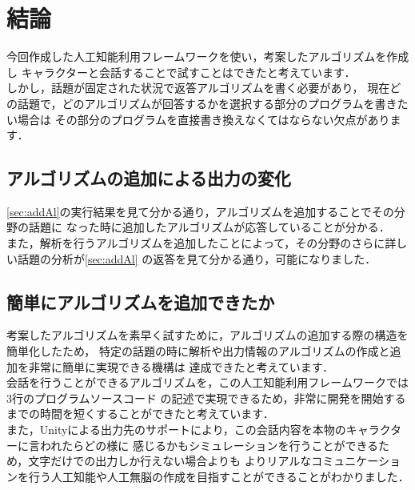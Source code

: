 
\section{結論}
今回作成した人工知能利用フレームワークを使い，考案したアルゴリズムを作成し
キャラクターと会話することで試すことはできたと考えています．
\\
しかし，話題が固定された状況で返答アルゴリズムを書く必要があり，
現在どの話題で，どのアルゴリズムが回答するかを選択する部分のプログラムを書きたい場合は
その部分のプログラムを直接書き換えなくてはならない欠点があります．

\subsection{アルゴリズムの追加による出力の変化}
\ref{sec:addAl}の実行結果を見て分かる通り，アルゴリズムを追加することでその分野の話題に
なった時に追加したアルゴリズムが応答していることが分かる．\\
また，解析を行うアルゴリズムを追加したことによって，その分野のさらに詳しい話題の分析が\ref{sec:addAl}
の返答を見て分かる通り，可能になりました．\\

\subsection{簡単にアルゴリズムを追加できたか}
考案したアルゴリズムを素早く試すために，アルゴリズムの追加する際の構造を簡単化したため，
特定の話題の時に解析や出力情報のアルゴリズムの作成と追加を非常に簡単に実現できる機構は
達成できたと考えています．
\\
会話を行うことができるアルゴリズムを，この人工知能利用フレームワークでは3行のプログラムソースコード
の記述で実現できるため，非常に開発を開始するまでの時間を短くすることができたと考えています．
\\
また，Unityによる出力先のサポートにより，この会話内容を本物のキャラクターに言われたらどの様に
感じるかもシミュレーションを行うことができるため，文字だけでの出力しか行えない場合よりも
よりリアルなコミュニケーションを行う人工知能や人工無脳の作成を目指すことができることがわかりました．


